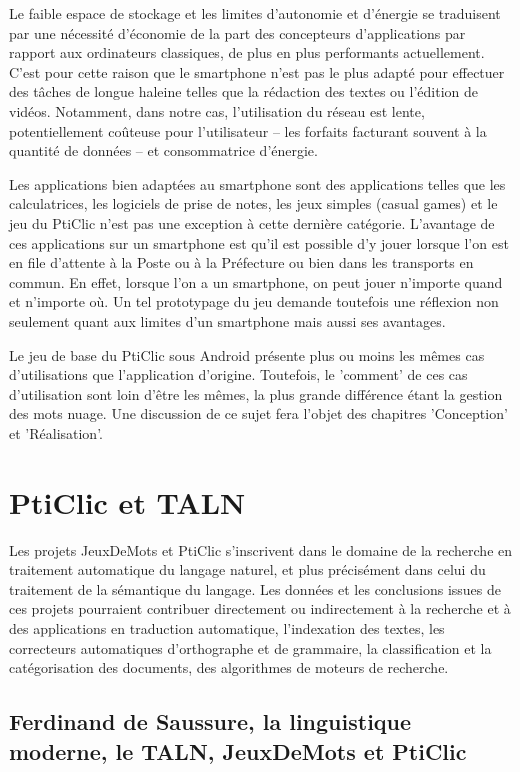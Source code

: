 \documentclass[a4paper,11pt,french]{article}
\def\android{Android\texttrademark{}}
\begin{document}
Le faible espace de stockage et les limites d'autonomie et d'énergie se traduisent par une nécessité d'économie de la part des concepteurs
d'applications par rapport aux ordinateurs classiques, de plus en plus performants actuellement. C'est pour cette raison que le smartphone
n'est pas le plus adapté pour effectuer des tâches de longue haleine telles que la rédaction des textes ou l'édition de vidéos. Notamment, dans notre cas,
l'utilisation du réseau est lente, potentiellement coûteuse pour l'utilisateur -- les forfaits facturant souvent à la quantité de données -- et
consommatrice d'énergie.

Les applications bien adaptées au smartphone sont des applications telles que les calculatrices, les logiciels de prise de notes, les jeux
simples (casual games) et le jeu du PtiClic n'est pas une exception à cette dernière catégorie. L'avantage de ces applications sur un smartphone est
qu'il est possible d'y jouer lorsque l'on est en file d'attente à la Poste ou à la Préfecture ou bien dans les transports en commun. En effet, lorsque l'on a un smartphone, on peut jouer n'importe quand et n'importe où. Un tel
prototypage du jeu demande toutefois une réflexion non seulement quant aux limites d'un smartphone mais aussi ses avantages.

Le jeu de base du PtiClic sous \android{} présente plus ou moins les mêmes cas d'utilisations que l'application d'origine. Toutefois, le 'comment' de ces cas d'utilisation sont loin d'être les mêmes, la plus grande différence étant la gestion des mots nuage. Une discussion de ce sujet fera l'objet des chapitres 'Conception' et 'Réalisation'.

\pagebreak

\section{PtiClic et TALN}


Les projets JeuxDeMots et PtiClic s'inscrivent dans le domaine de la recherche en traitement automatique du langage naturel, et plus précisément dans celui du traitement de la sémantique du langage. Les données et les conclusions issues de ces projets pourraient contribuer directement ou indirectement à la recherche et à des applications en traduction automatique, l'indexation des textes, les correcteurs automatiques d'orthographe et de grammaire, la classification et la catégorisation des documents, des algorithmes de moteurs de recherche.


\subsection{Ferdinand de Saussure, la linguistique moderne, le TALN, JeuxDeMots et PtiClic}
\end{document}
